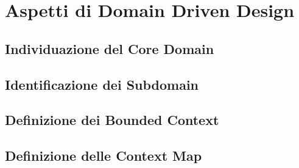\chapter{Aspetti di Domain Driven Design}
    \section{Individuazione del Core Domain}
    \section{Identificazione dei Subdomain}
    \section{Definizione dei Bounded Context}
    \section{Definizione delle Context Map}